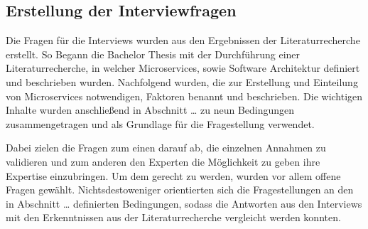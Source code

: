 \subsection{Erstellung der Interviewfragen}

Die Fragen für die Interviews wurden aus den Ergebnissen der Literaturrecherche erstellt. So Begann die Bachelor Thesis mit der Durchführung einer Literaturrecherche, in welcher Microservices, sowie Software Architektur definiert und beschrieben wurden. Nachfolgend wurden, die zur Erstellung und Einteilung von Microservices notwendigen, Faktoren benannt und beschrieben.  Die wichtigen Inhalte wurden anschließend in Abschnitt … zu neun Bedingungen zusammengetragen und als Grundlage für die Fragestellung verwendet.

Dabei zielen die Fragen zum einen darauf ab, die einzelnen Annahmen zu validieren und zum anderen den Experten die Möglichkeit zu geben ihre Expertise einzubringen. Um dem gerecht zu werden, wurden vor allem offene Fragen gewählt. Nichtsdestoweniger orientierten sich die Fragestellungen an den in Abschnitt … definierten Bedingungen, sodass die Antworten aus den Interviews mit den Erkenntnissen aus der Literaturrecherche vergleicht werden konnten.